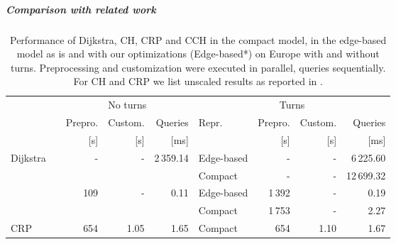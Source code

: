 \documentclass[a4paper, english, cleveref]{lipics-v2021}
\begin{document}
\subparagraph{Comparison with related work}

\begin{table}
\centering
\caption{
Performance of Dijkstra, CH, CRP and CCH in the compact model, in the edge-based model as is and with our optimizations (Edge-based*) on Europe with and without turns.
Preprocessing and customization were executed in parallel, queries sequentially.
For CH and CRP we list unscaled results as reported in \cite{DellingGPW17}.
}\label{tab:related_work_turns}
\begin{tabular}{l@{\hskip4pt}crrrlrrr}
\toprule
{}                        &                                      & \multicolumn{3}{c}{No turns}                                           & \multicolumn{4}{c}{Turns}                  \\
                                                                   \cmidrule(lr){3-5}                                                       \cmidrule(lr){6-9}
{}                        &                                      &             Prepro.  &            Custom. &                    Queries & Repr.      & Prepro. & Custom. &   Queries \\
{}                        &                                      &                 [s]  &                [s] &                       [ms] &            &     [s] &     [s] &      [ms] \\
\midrule
\multirow{2}{*}{Dijkstra} &                                      &   \multirow{2}{*}{-} & \multirow{2}{*}{-} & \multirow{2}{*}{2\,359.14} & Edge-based &       - &       - &  6\,225.60 \\
                          &                                      &                      &                    &                            &    Compact &       - &       - & 12\,699.32 \\
\addlinespace
\multirow{2}{*}{CH}       & \multirow{2}{*}{\cite{DellingGPW17}} & \multirow{2}{*}{109} & \multirow{2}{*}{-} &      \multirow{2}{*}{0.11} & Edge-based &  1\,392 &       - &       0.19 \\
                          &                                      &                      &                    &                            &    Compact &  1\,753 &       - &       2.27 \\
\addlinespace
CRP                       & \cite{DellingGPW17}                  &                  654 &               1.05 &                       1.65 &    Compact &     654 &    1.10 &       1.67 \\

\end{tabular}
\end{table}
\end{document}
